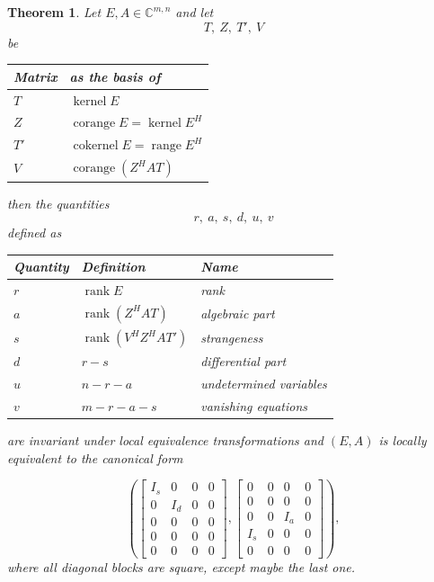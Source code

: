\documentclass[]{book}
\newtheorem{theorem}{Theorem}[chapter]
\theoremstyle{definition}
\theoremstyle{definition}
\theoremstyle{definition}
\theoremstyle{definition}
\theoremstyle{remark}
\begin{document}
\begin{theorem}
\protect\hypertarget{thm:local-canonical-form}{}{\label{thm:local-canonical-form} }Let \(E, A \in \mathbb C^{m,n}\) and let
\begin{equation}
T,~Z,~T',~V \label{eq:lcf-subspaces}
\end{equation}
be

\begin{longtable}[]{@{}ll@{}}
\toprule
Matrix & as the basis of\tabularnewline
\midrule
\endhead
\(T\) & \(\operatorname{kernel}E\)\tabularnewline
\(Z\) & \(\operatorname{corange}E = \operatorname{kernel}E^H\)\tabularnewline
\(T'\) & \(\operatorname{cokernel}E = \operatorname{range}E^H\)\tabularnewline
\(V\) & \(\operatorname{corange}(Z^HAT)\)\tabularnewline
\bottomrule
\end{longtable}

then the quantities
\begin{equation}
r,~a,~s,~d,~u,~v \label{eq:lcf-quantities}
\end{equation}
defined as

\begin{longtable}[]{@{}lll@{}}
\toprule
Quantity & Definition & Name\tabularnewline
\midrule
\endhead
\(r\) & \(\operatorname{rank}E\) & \emph{rank}\tabularnewline
\(a\) & \(\operatorname{rank}(Z^HAT)\) & \emph{algebraic part}\tabularnewline
\(s\) & \(\operatorname{rank}(V^HZ^HAT')\) & \emph{strangeness}\tabularnewline
\(d\) & \(r-s\) & \emph{differential part}\tabularnewline
\(u\) & \(n-r-a\) & \emph{undetermined variables}\tabularnewline
\(v\) & \(m-r-a-s\) & \emph{vanishing equations}\tabularnewline
\bottomrule
\end{longtable}

are invariant under local equivalence transformations and \((E, A)\) is locally equivalent to the canonical form

\begin{equation}
\left(\begin{bmatrix}
I_s & 0 & 0 & 0 \\
0 & I_d & 0 & 0 \\
0 & 0 & 0 & 0 \\
0 & 0 & 0 & 0 \\
0 & 0 & 0 & 0
\end{bmatrix},
\begin{bmatrix}
0 & 0 & 0 & 0  \\
0 & 0 & 0 & 0  \\
0 & 0 & I_a & 0 \\
I_s & 0 & 0 & 0 \\
0 & 0 & 0 & 0
\end{bmatrix}\right),
\label{eq:local-canonical-form}
\end{equation}
where all diagonal blocks are square, except maybe the last one.
\end{theorem}
\end{document}
